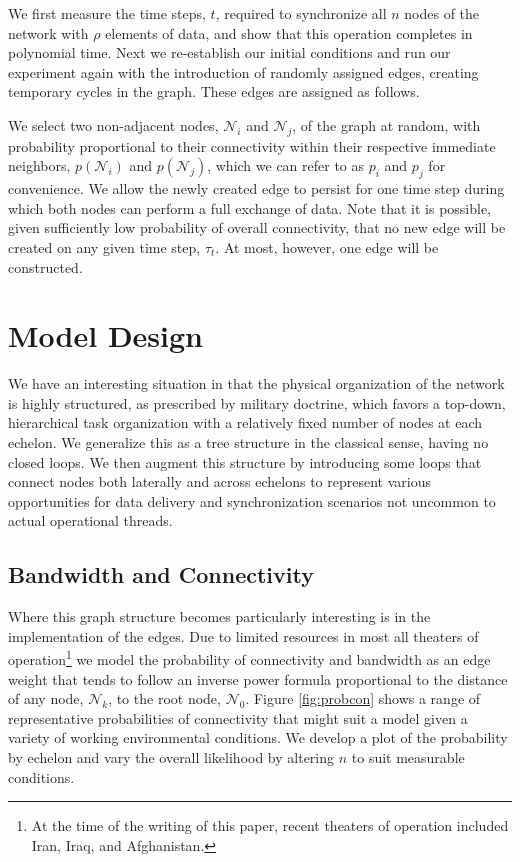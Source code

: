 \documentclass[10pt]{./IEEEtran}
\begin{document}
We first measure the time steps, $t$, required to synchronize all $n$ nodes of the network with $\rho$ elements of data, and show that this operation completes in polynomial time.  Next we re-establish our initial conditions and run our experiment again with the introduction of randomly assigned edges, creating temporary cycles in the graph.  These edges are assigned as follows.

We select two non-adjacent nodes, $\mathscr{N}_{i}$ and $\mathscr{N}_{j}$, of the graph at random, with probability proportional to their connectivity within their respective immediate neighbors, $p(\mathscr{N}_{i})$ and $p(\mathscr{N}_{j})$, which we can refer to as $p_{i}$ and $p_{j}$ for convenience.  We allow the newly created edge to persist for one time step during which both nodes can perform a full exchange of data.  Note that it is possible, given sufficiently low probability of overall connectivity, that no new edge will be created on any given time step, $\tau_{t}$.  At most, however, one edge will be constructed.


\section{Model Design}
\label{sec:model}
We have an interesting situation in that the physical organization of the network is highly structured, as prescribed by military doctrine, which favors a top-down, hierarchical task organization with a relatively fixed number of nodes at each echelon.  We generalize this as a tree structure in the classical sense, having no closed loops.  We then augment this structure by introducing some loops that connect nodes both laterally and across echelons to represent various opportunities for data delivery and synchronization scenarios not uncommon to actual operational threads.

\subsection{Bandwidth and Connectivity}

Where this graph structure becomes particularly interesting is in the implementation of the edges.  Due to limited resources in most all theaters of operation\footnote{At the time of the writing of this paper, recent theaters of operation included Iran, Iraq, and Afghanistan.} we model the probability of connectivity and bandwidth as an edge weight that tends to follow an inverse power formula proportional to the distance of any node, $\mathscr{N}_{k}$, to the root node, $\mathscr{N}_{0}$.  Figure \ref{fig:probcon} shows a range of representative probabilities of connectivity that might suit a model given a variety of working environmental conditions.  We develop a plot of the probability by echelon and vary the overall likelihood by altering $n$ to suit measurable conditions.
\end{document}
